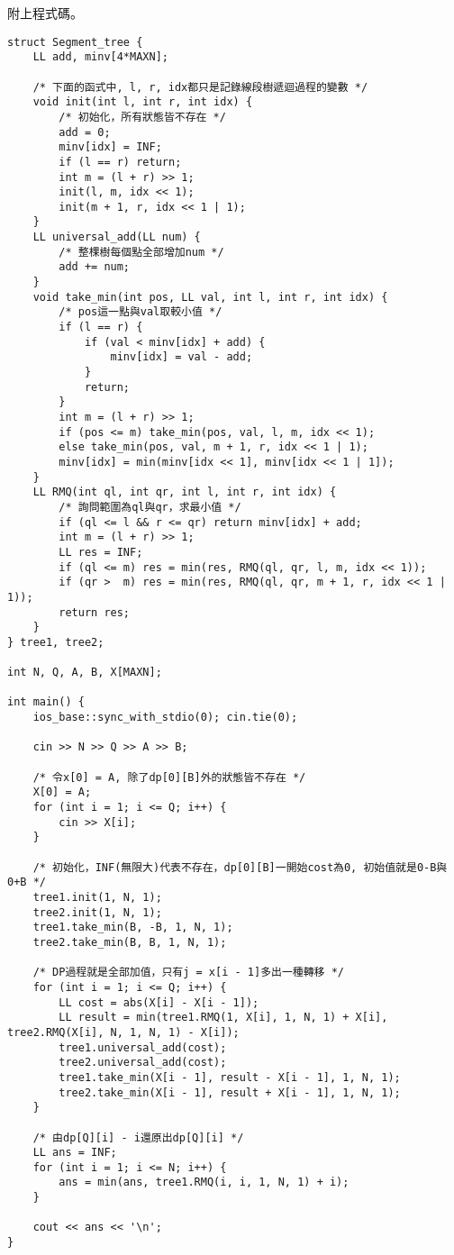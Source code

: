附上程式碼。
\begin{lstlisting}[caption=Many Moves的程式碼]
struct Segment_tree {
	LL add, minv[4*MAXN];

	/* 下面的函式中, l, r, idx都只是記錄線段樹遞迴過程的變數 */
	void init(int l, int r, int idx) {
		/* 初始化，所有狀態皆不存在 */
		add = 0;
		minv[idx] = INF;
		if (l == r) return;
		int m = (l + r) >> 1;
		init(l, m, idx << 1);
		init(m + 1, r, idx << 1 | 1);
	}
	LL universal_add(LL num) {
		/* 整棵樹每個點全部增加num */
		add += num;
	}
	void take_min(int pos, LL val, int l, int r, int idx) {
		/* pos這一點與val取較小值 */
		if (l == r) {
			if (val < minv[idx] + add) {
				minv[idx] = val - add;
			}
			return;
		}
		int m = (l + r) >> 1;
		if (pos <= m) take_min(pos, val, l, m, idx << 1);
		else take_min(pos, val, m + 1, r, idx << 1 | 1);
		minv[idx] = min(minv[idx << 1], minv[idx << 1 | 1]);
	}
	LL RMQ(int ql, int qr, int l, int r, int idx) {
		/* 詢問範圍為ql與qr，求最小值 */
		if (ql <= l && r <= qr) return minv[idx] + add;
		int m = (l + r) >> 1;
		LL res = INF;
		if (ql <= m) res = min(res, RMQ(ql, qr, l, m, idx << 1));
		if (qr >  m) res = min(res, RMQ(ql, qr, m + 1, r, idx << 1 | 1));
		return res;
	}
} tree1, tree2;

int N, Q, A, B, X[MAXN];

int main() {
	ios_base::sync_with_stdio(0); cin.tie(0);

	cin >> N >> Q >> A >> B;

	/* 令x[0] = A, 除了dp[0][B]外的狀態皆不存在 */
	X[0] = A;
	for (int i = 1; i <= Q; i++) {
		cin >> X[i];
	}

	/* 初始化，INF(無限大)代表不存在，dp[0][B]一開始cost為0, 初始值就是0-B與0+B */
	tree1.init(1, N, 1);
	tree2.init(1, N, 1);
	tree1.take_min(B, -B, 1, N, 1);
	tree2.take_min(B, B, 1, N, 1);

	/* DP過程就是全部加值，只有j = x[i - 1]多出一種轉移 */
	for (int i = 1; i <= Q; i++) {
		LL cost = abs(X[i] - X[i - 1]);
		LL result = min(tree1.RMQ(1, X[i], 1, N, 1) + X[i], tree2.RMQ(X[i], N, 1, N, 1) - X[i]);
		tree1.universal_add(cost);
		tree2.universal_add(cost);
		tree1.take_min(X[i - 1], result - X[i - 1], 1, N, 1);
		tree2.take_min(X[i - 1], result + X[i - 1], 1, N, 1);
	}

	/* 由dp[Q][i] - i還原出dp[Q][i] */
	LL ans = INF;
	for (int i = 1; i <= N; i++) {
		ans = min(ans, tree1.RMQ(i, i, 1, N, 1) + i);
	}

	cout << ans << '\n';
}
\end{lstlisting}

